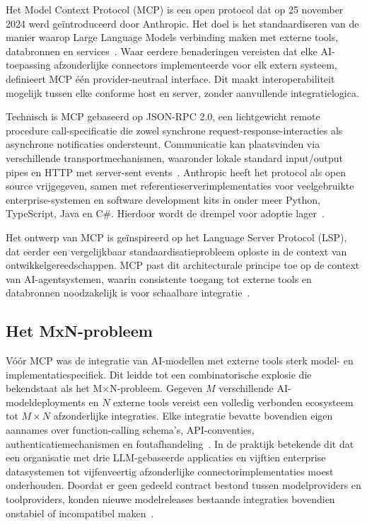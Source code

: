 Het Model Context Protocol (MCP) is een open protocol dat op 25 november 2024 werd geïntroduceerd door Anthropic. Het doel is het standaardiseren van de manier waarop Large Language Models verbinding maken met externe tools, databronnen en services~\cite{hou2025modelcontextprotocolmcp}. Waar eerdere benaderingen vereisten dat elke AI-toepassing afzonderlijke connectors implementeerde voor elk extern systeem, definieert MCP één provider-neutraal interface. Dit maakt interoperabiliteit mogelijk tussen elke conforme host en server, zonder aanvullende integratielogica.

Technisch is MCP gebaseerd op JSON-RPC 2.0, een lichtgewicht remote procedure call-specificatie die zowel synchrone request-response-interacties als asynchrone notificaties ondersteunt. Communicatie kan plaatsvinden via verschillende transportmechanismen, waaronder lokale standard input/output pipes en HTTP met server-sent events~\cite{Ray_2025}. Anthropic heeft het protocol als open source vrijgegeven, samen met referentieserverimplementaties voor veelgebruikte enterprise-systemen en software development kits in onder meer Python, TypeScript, Java en C\#. Hierdoor wordt de drempel voor adoptie lager~\cite{Sekar2026MCP}.

Het ontwerp van MCP is geïnspireerd op het Language Server Protocol (LSP), dat eerder een vergelijkbaar standaardisatieprobleem oploste in de context van ontwikkelgereedschappen. MCP past dit architecturale principe toe op de context van AI-agentsystemen, waarin consistente toegang tot externe tools en databronnen noodzakelijk is voor schaalbare integratie~\cite{hou2025modelcontextprotocolmcp}.

\subsection{Het MxN-probleem}\label{subsec:mxn}

Vóór MCP was de integratie van AI-modellen met externe tools sterk model- en implementatiespecifiek. Dit leidde tot een combinatorische explosie die bekendstaat als het M×N-probleem. Gegeven $M$ verschillende AI-modeldeployments en $N$ externe tools vereist een volledig verbonden ecosysteem tot $M \times N$ afzonderlijke integraties. Elke integratie bevatte bovendien eigen aannames over function-calling schema's, API-conventies, authenticatiemechanismen en foutafhandeling~\cite{Ray_2025}. In de praktijk betekende dit dat een organisatie met drie LLM-gebaseerde applicaties en vijftien enterprise datasystemen tot vijfenveertig afzonderlijke connectorimplementaties moest onderhouden. Doordat er geen gedeeld contract bestond tussen modelproviders en toolproviders, konden nieuwe modelreleases bestaande integraties bovendien onstabiel of incompatibel maken~\cite{hou2025modelcontextprotocolmcp}.


